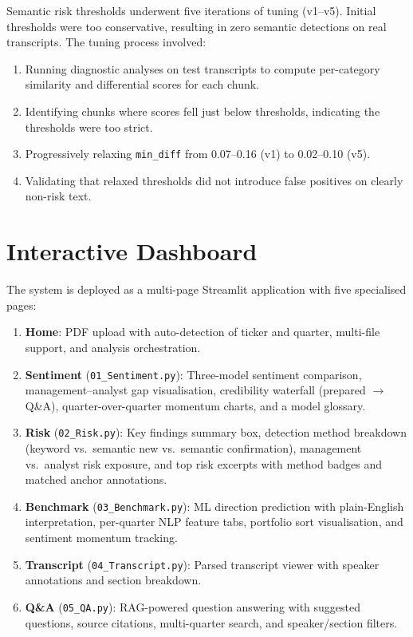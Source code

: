 \documentclass[12pt,a4paper]{article}
\begin{document}
Semantic risk thresholds underwent five iterations of tuning (v1--v5). Initial thresholds were too conservative, resulting in zero semantic detections on real transcripts. The tuning process involved:
\begin{enumerate}[noitemsep]
    \item Running diagnostic analyses on test transcripts to compute per-category similarity and differential scores for each chunk.
    \item Identifying chunks where scores fell just below thresholds, indicating the thresholds were too strict.
    \item Progressively relaxing \texttt{min\_diff} from 0.07--0.16 (v1) to 0.02--0.10 (v5).
    \item Validating that relaxed thresholds did not introduce false positives on clearly non-risk text.
\end{enumerate}


\section{Interactive Dashboard}
\label{sec:dashboard}

The system is deployed as a multi-page Streamlit application with five specialised pages:

\begin{enumerate}[noitemsep]
    \item \textbf{Home}: PDF upload with auto-detection of ticker and quarter, multi-file support, and analysis orchestration.
    \item \textbf{Sentiment} (\texttt{01\_Sentiment.py}): Three-model sentiment comparison, management--analyst gap visualisation, credibility waterfall (prepared $\to$ Q\&A), quarter-over-quarter momentum charts, and a model glossary.
    \item \textbf{Risk} (\texttt{02\_Risk.py}): Key findings summary box, detection method breakdown (keyword vs.\ semantic new vs.\ semantic confirmation), management vs.\ analyst risk exposure, and top risk excerpts with method badges and matched anchor annotations.
    \item \textbf{Benchmark} (\texttt{03\_Benchmark.py}): ML direction prediction with plain-English interpretation, per-quarter NLP feature tabs, portfolio sort visualisation, and sentiment momentum tracking.
    \item \textbf{Transcript} (\texttt{04\_Transcript.py}): Parsed transcript viewer with speaker annotations and section breakdown.
    \item \textbf{Q\&A} (\texttt{05\_QA.py}): RAG-powered question answering with suggested questions, source citations, multi-quarter search, and speaker/section filters.
\end{enumerate}
\end{document}

